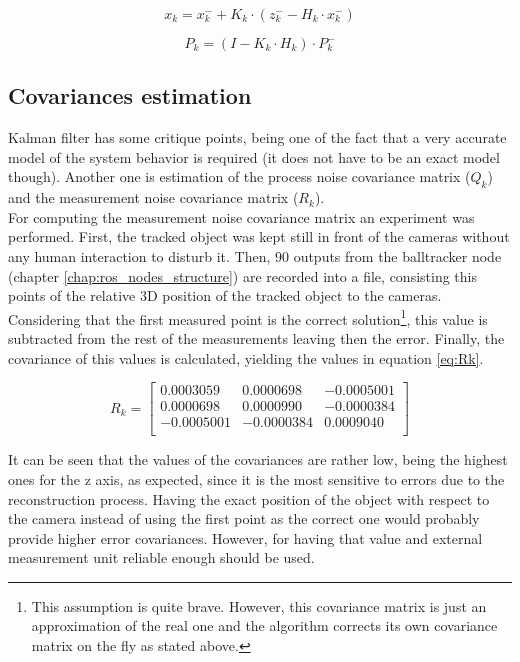 \begin{equation}
x_{k}=x_{k}^{-}+K_{k} \cdot (z_{k}^{-}-H_{k} \cdot x_{k}^{-})
\label{eq:final_state}
\end{equation}

\begin{equation}
P_{k}=(I-K_{k} \cdot H_{k}) \cdot P_{k}^{-}
\label{eq:error_covariance}
\end{equation}

\subsection{Covariances estimation}
Kalman filter has some critique points, being one of the fact that a very accurate model of the system behavior is required (it does not have to be an exact model though). Another one is estimation of the process noise covariance matrix ($Q_{k}$) and the measurement noise covariance matrix ($R_{k}$).\\

For computing the measurement noise covariance matrix an experiment was performed. First, the tracked object was kept still in front of the cameras without any human interaction to disturb it. Then, 90 outputs from the balltracker node (chapter \ref{chap:ros_nodes_structure}) are recorded into a file, consisting this points of the relative 3D position of the tracked object to the cameras. Considering that the first measured point is the correct solution\footnote{This assumption is quite brave. However, this covariance matrix is just an approximation of the real one and the algorithm corrects its own covariance matrix on the fly as stated above.}, this value is subtracted from the rest of the measurements leaving then the error. Finally, the covariance of this values is calculated, yielding the values in equation \eqref{eq:Rk}.

\begin{equation}
R_{k}=
\begin{bmatrix}
0.0003059 & 0.0000698 & -0.0005001 \\
0.0000698 & 0.0000990 & -0.0000384 \\
-0.0005001 & -0.0000384 & 0.0009040 \\
\end{bmatrix}
\label{eq:Rk}
\end{equation}

It can be seen that the values of the covariances are rather low, being the highest ones for the z axis, as expected, since it is the most sensitive to errors due to the reconstruction process. Having the exact position of the object with respect to the camera instead of using the first point as the correct one would probably provide higher error covariances. However, for having that value and external measurement unit reliable enough should be used. \\

